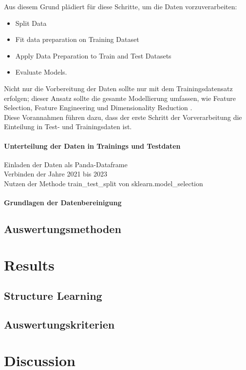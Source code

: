 \documentclass[12pt]{report}
\begin{document}
	Aus diesem Grund plädiert \cite{Brownlee.2020} für diese Schritte, um die Daten vorzuverarbeiten:
	\begin{itemize} \itemsep0pt
		\item Split Data
		\item Fit data preparation on Training Dataset
		\item Apply Data Preparation to Train and Test Datasets
		\item Evaluate Models.
	\end{itemize}
	Nicht nur die Vorbereitung der Daten sollte nur mit dem Trainingsdatensatz erfolgen; dieser Ansatz sollte die gesamte Modellierung umfassen, wie Feature Selection, Feature Engineering und  Dimensionality Reduction \cite[27]{Brownlee.2020}.\\
	Diese Vorannahmen führen dazu, dass der erste Schritt der Vorverarbeitung die Einteilung in Test- und Trainingsdaten ist.
	\subsubsection{Unterteilung der Daten in Trainings und Testdaten}
	Einladen der Daten als Panda-Dataframe\\
	Verbinden der Jahre 2021 bis 2023\\
	Nutzen der Methode train\_test\_split von sklearn.model\_selection\\
	\subsubsection{Grundlagen der Datenbereinigung} 
	
	
	\section{Auswertungsmethoden}
	\chapter{Results}
	\section{Structure Learning}
	\section{Auswertungskriterien}
	\chapter{Discussion}
\end{document}
